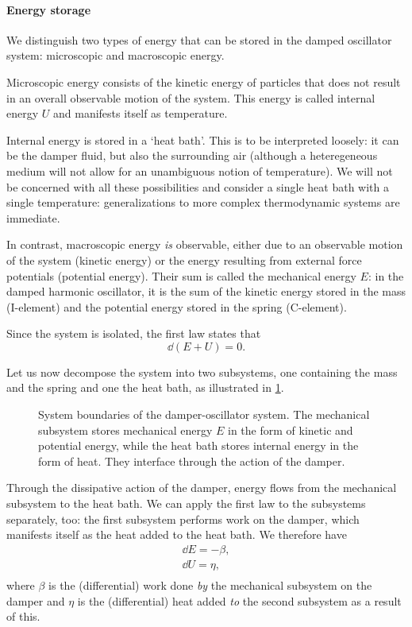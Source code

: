 \paragraph{Energy storage} We distinguish two types of energy that can be stored in the damped oscillator system: microscopic and macroscopic energy.

Microscopic energy consists of the kinetic energy of particles that does not result in an overall observable motion of the system. This energy is called internal energy $U$ and manifests itself as temperature. 

Internal energy is stored in a `heat bath'. This is to be interpreted loosely: it can be the damper fluid, but also the surrounding air (although a heteregeneous medium will not allow for an unambiguous notion of temperature). We will not be concerned with all these possibilities and consider a single heat bath with a single temperature: generalizations to more complex thermodynamic systems are immediate. 

In contrast, macroscopic energy \emph{is} observable, either due to an observable motion of the system (kinetic energy) or the energy resulting from external force potentials (potential energy). Their sum is called the mechanical energy $E$: in the damped harmonic oscillator, it is the sum of the kinetic energy stored in the mass (I-element) and the potential energy stored in the spring (C-element).

Since the system is isolated, the first law states that 
\begin{equation}
    \dd{(E + U)} = 0. 
    \label{eq:dho_first_law}
\end{equation}

Let us now decompose the system into two subsystems, one containing the mass and the spring and one the heat bath, as illustrated in \cref{fig:oscillator_thermo}. 
\begin{figure}[ht!]
    \centering
    
    \caption{System boundaries of the damper-oscillator system. The mechanical subsystem stores mechanical energy $E$ in the form of kinetic and potential energy, while the heat bath stores internal energy in the form of heat. They interface through the action of the damper.}
    \label{fig:oscillator_thermo}
\end{figure}

Through the dissipative action of the damper, energy flows from the mechanical subsystem to the heat bath. We can apply the first law to the subsystems separately, too: the first subsystem performs work on the damper, which manifests itself as the heat added to the heat bath. We therefore have
\begin{equation}
    \begin{split}
        \dd{E}  = -\beta, \\[0.2cm]
        \dd{U} = \eta, \\
    \end{split}
    \label{eq:dho_energy_balance}
\end{equation}
where $\beta$ is the (differential) work done \emph{by} the mechanical subsystem on the damper and $\eta$ is the (differential) heat added \emph{to} the second subsystem as a result of this. 

